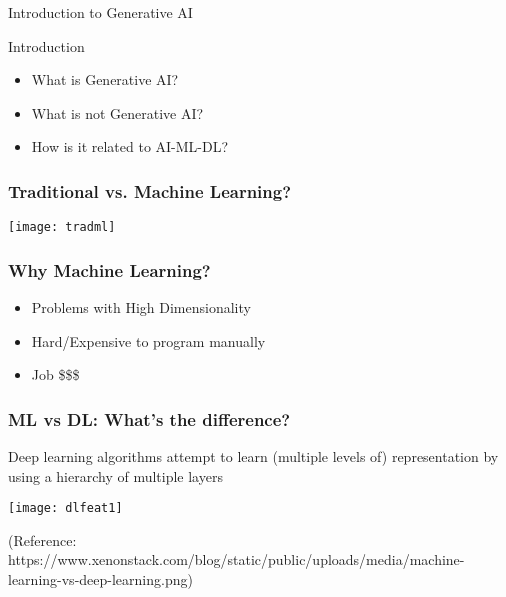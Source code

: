 \begin{frame}[fragile]\frametitle{}
\begin{center}
{\Large Introduction to Generative AI}
\end{center}
\end{frame}

\begin{frame}[fragile]{Introduction}
\begin{itemize}
\item What is Generative AI?
\item What is not Generative AI?
\item How is it related to AI-ML-DL?
\end{itemize}
\end{frame}

\begin{frame}[fragile]\frametitle{Traditional vs. Machine Learning?}
\begin{center}
\texttt{[image: tradml]}
\end{center}
\end{frame}

\begin{frame}[fragile]\frametitle{Why Machine Learning?}
\begin{itemize}
\item Problems with High Dimensionality
\item Hard/Expensive to program manually
\item Job \$\$\$
\end{itemize}
\end{frame}


\begin{frame}[fragile] \frametitle{ML vs DL: What's the difference?}
Deep learning algorithms attempt to learn (multiple levels of) representation by using a hierarchy of multiple layers
\begin{center}
\texttt{[image: dlfeat1]}
\end{center}
\tiny{(Reference: https://www.xenonstack.com/blog/static/public/uploads/media/machine-learning-vs-deep-learning.png)}

\end{frame}

